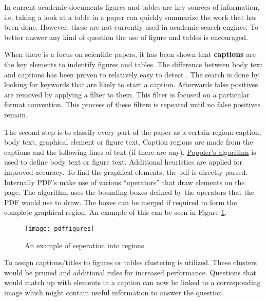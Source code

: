 In current academic documents figures and tables are key sources of information, i.e. taking a look at a table in a paper can quickly summarize the work that has been done.
However, these are not currently used in academic search engines.
To better answer any kind of question the use of figure and tables is encouraged.

When there is a focus on scientific papers, it has been shown that \textbf{captions} are the key elements to indentify figures and tables.
The difference between body text and captions has been proven to relatively easy to detect \cite{pdffigures2}.
The search is done by looking for keywords that are likely to start a caption.
Afterwards false positives are removed by applying a filter to them.
This filter is focused on a particular format convention.
This process of these filters is repeated until no false positives remain.

The second step is to classify every part of the paper as a certain region: caption, body text, graphical element or figure text.
Caption regions are made from the captions and the following lines of text (if there are any).
\href{https://poppler.freedesktop.org/}{Poppler's algorithm} is used to define body text or figure text.
Additional heuristics are applied for improved accuracy. 
To find the graphical elements, the pdf is directly parsed. 
Internally PDF's make use of various ``operators'' that draw elements on the page. 
The algorithm uses the bounding boxes defined by the operators that the PDF would use to draw.
The boxes can be merged if required to form the complete graphical region.
An example of this can be seen in Figure \ref{fig:pdffigure}.

\begin{figure}
\texttt{[image: pdffigures]}
\caption{An example of seperation into regions}\label{fig:pdffigure}
\end{figure}


To assign captions/titles to figures or tables clustering is utilized. 
These clusters would be pruned and additional rules for increased performance.
Questions that would match up with elements in a caption can now be linked to a corresponding image which might contain useful information to answer the question.

